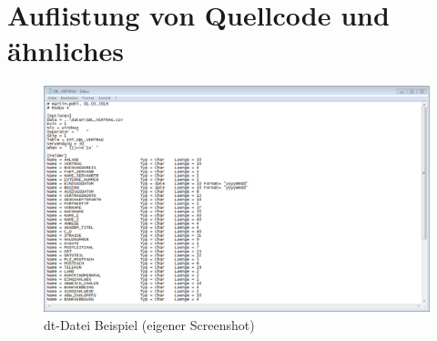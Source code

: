 
\appendix
\chapter{Auflistung von Quellcode und ähnliches}

\begin{figure}[ht]
	\begin{center}
		\includegraphics[scale=0.5]{bilder/tdDatei.png}
		\caption{dt-Datei Beispiel (eigener Screenshot)}
		\label{pic:DTD:end}
	\end{center}
\end{figure}

